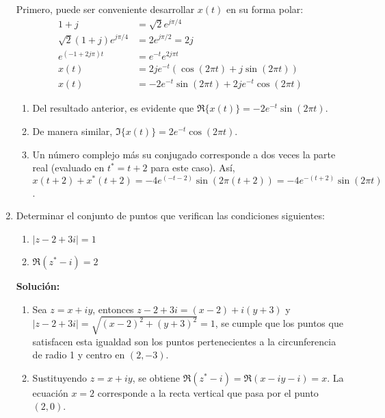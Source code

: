 \documentclass[letterpaper, 12pt]{article}
\newif\ifanswers
\begin{document}
\begin{enumerate}
{    Primero, puede ser conveniente desarrollar $x(t)$ en su forma polar:
    \begin{align*}
        1+j &= \sqrt{2}e^{j\pi/4} \\
        \sqrt{2}(1+j)e^{j\pi/4} &= 2e^{j\pi/2}= 2 j \\
        e^{(-1+2j\pi)t} &= e^{-t} e^{2j\pi t} \\
        x(t) &= 2j e^{-t}(\cos(2\pi t)+j\sin(2\pi t)) \\
        x(t) &= -2e^{-t}\sin(2\pi t) + 2je^{-t} \cos(2\pi t)
    \end{align*}
    \begin{enumerate}
        \item Del resultado anterior, es evidente que $\Re\{x(t)\}=-2e^{-t}\sin(2\pi t)$.
        \item De manera similar, $\Im\{x(t)\}=2e^{-t}\cos(2\pi t)$.
        \item Un número complejo más su conjugado corresponde a dos veces la parte real (evaluado en $t^{*}=t+2$ para este caso). Así, $x(t+2)+x^{*}(t+2) = -4e^{(-t-2)}\sin(2\pi(t+2))=-4e^{-(t+2)}\sin(2\pi t)$.
    \end{enumerate}}
    \fi


    \item Determinar el conjunto de puntos que verifican las condiciones siguientes: 
    \begin{enumerate}
        \item \(|z-2+3i| = 1\)
        \item \(\Re (z^* - i) = 2\)
    \end{enumerate}

    \ifanswers
    {\color{red}\textbf{Solución:}
    \begin{enumerate}
        \item Sea \(z = x + iy\), entonces \(z-2 + 3i = (x - 2) + i(y + 3) \) y \(|z-2+3i| = \sqrt{(x-2)^2 + (y+3)^2} = 1\), se cumple que los puntos que satisfacen esta igualdad son los puntos pertenecientes a la circunferencia de radio 1 y centro en \((2, -3)\).

        \item Sustituyendo \( z = x + iy \), se obtiene \( \Re(z^* - i) = \Re(x - iy - i) = x \). La ecuación \( x = 2 \) corresponde a la recta vertical que pasa por el punto \( (2,0) \).
    \end{enumerate}
    
}
\end{enumerate}
\end{document}
